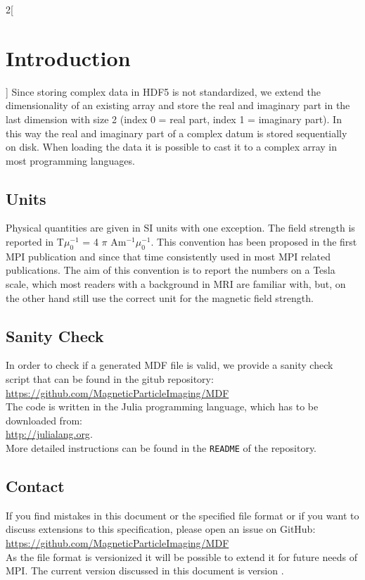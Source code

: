\documentclass[landscape]{article} %
\begin{document}
\begin{multicols}{2}[\section{Introduction} \label{Sec:Introduction}]
Since storing complex data in HDF5 is not standardized, we extend the dimensionality of an existing array and store the real and imaginary part in the last dimension with size 2 (index 0 = real part, index 1 = imaginary part). In this way the real and imaginary part of a complex datum is stored sequentially on disk. When loading the data it is possible to cast it to a complex array in most programming languages.

\subsection{Units}

Physical quantities are given in SI units with one exception. The field strength is reported in T$\mu_0^{-1}$ = 4 $\pi$ Am$^{-1}\mu_0^{-1}$. This convention has been proposed in the first MPI publication and since that time consistently used in most MPI related publications. The aim of this convention is to report the numbers on a Tesla scale, which most readers with a background in MRI are familiar with, but, on the other hand still use the correct unit for the magnetic field strength.


\subsection{Sanity Check}

In order to check if a generated MDF file is valid, we provide a sanity check script that can be found in the gitub repository:\\
\hspace*{1cm}\url{https://github.com/MagneticParticleImaging/MDF}\\
The code is written in the Julia programming language, which has to be downloaded from: \\
\hspace*{1cm} \url{http://julialang.org}.\\
More detailed instructions can be found in the \texttt{README} of the repository.

\subsection{Contact}

If you find mistakes in this document or the specified file format or if you want to discuss extensions to this specification, please open an issue on GitHub:\\
\hspace*{1cm}\url{https://github.com/MagneticParticleImaging/MDF}\\
As the file format is versionized it will be possible to extend it for future needs of MPI. The current version discussed in this document is version \version.


\end{multicols}
\end{document}
